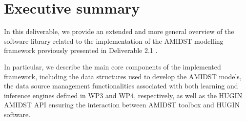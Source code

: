 \section{Executive summary}\label{section:executiveSummary}

In this deliverable, we provide an extended and more general overview of the software library related to the implementation of the AMIDST modelling framework previously presented in Deliverable 2.1 \cite{Deliverable2.1}. 



In particular, we describe the main core components of the implemented framework, including the data structures used to develop the AMIDST models, the data source management functionalities associated with both learning and inference engines defined in WP3 and WP4, respectively, as well as the HUGIN AMIDST API ensuring the interaction between AMIDST toolbox and HUGIN software.


